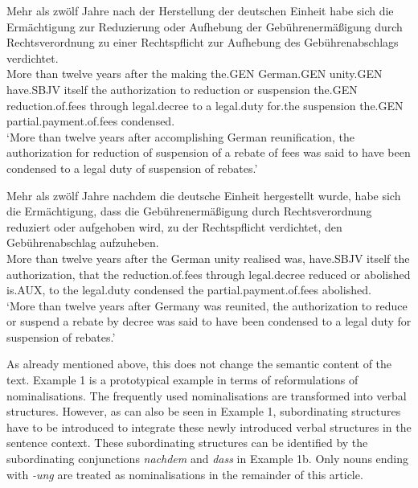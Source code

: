 \documentclass[output=paper]{langsci/langscibook}
\begin{document}
\ea
\gll Mehr als zwölf Jahre nach der Herstellung der deutschen Einheit habe sich die Ermächtigung zur Reduzierung oder Aufhebung der Gebührenermäßigung durch Rechtsverordnung zu einer Rechtspflicht zur Aufhebung des Gebührenabschlags verdichtet. \\
More than twelve years after the making the.GEN German.GEN unity.GEN have.SBJV itself the authorization to reduction or suspension the.GEN reduction.of.fees through legal.decree to a legal.duty for.the suspension the.GEN partial.payment.of.fees condensed.\\
\glt `More than twelve years after accomplishing German reunification, the authorization for reduction of suspension of a rebate of fees was said to have been condensed to a legal duty of suspension of rebates.'
\z

\ea
\gll Mehr als zwölf Jahre nachdem die deutsche Einheit hergestellt wurde, habe sich die Ermächtigung, dass die Gebührenermäßigung durch Rechtsverordnung reduziert oder aufgehoben wird, zu der Rechtspflicht verdichtet, den Gebührenabschlag aufzuheben. \\
More than twelve years after the German unity realised was, have.SBJV itself the authorization, that the reduction.of.fees through legal.decree reduced or abolished is.AUX, to the legal.duty condensed the partial.payment.of.fees abolished.\\
\glt `More than twelve years after Germany was reunited, the authorization to reduce or suspend a rebate by decree was said to have been condensed to a legal duty for suspension of rebates.'
\z

As already mentioned above, this does not change the semantic content of the text. Example 1 is a prototypical example in terms of reformulations of nominalisations. The frequently used nominalisations are transformed into verbal structures. However, as can also be seen in Example 1, subordinating structures have to be introduced to integrate these newly introduced verbal structures in the sentence context. These subordinating structures can be identified by the subordinating conjunctions \textit{nachdem} and \textit{dass} in Example 1b. Only nouns ending with \textit{-ung} are treated as nominalisations in the remainder of this article.
\end{document}
